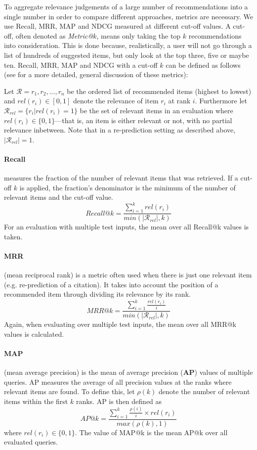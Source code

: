 To aggregate relevance judgements of a large number of recommendations into a single number in order to compare different approaches, metrics are necessary. We use Recall, MRR, MAP and NDCG measured at different cut-off values. A cut-off, often denoted as \emph{Metric@}$k$, means only taking the top $k$ recommendations into consideration. This is done because, realistically, a user will not go through a list of hundreds of suggested items, but only look at the top three, five or maybe ten. Recall, MRR, MAP and NDCG with a cut-off $k$ can be defined as follows (see \cite{Aggarwal2016} for a more detailed, general discussion of these metrics):

Let $\mathcal{R} = r_1,r_2, ..., r_n$ be the ordered list of recommended items (highest to lowest) and ${\mathit{rel}(r_i)\in[0, 1]}$ denote the relevance of item $r_i$ at rank $i$. Furthermore let ${\mathcal{R}_{rel}=\{r_i|\mathit{rel}(r_i)=1\}}$ be the set of relevant items in an evaluation where $\mathit{rel}(r_i)\in\{0,1\}$---that is, an item is either relevant or not, with no partial relevance inbetween. Note that in a re-prediction setting as described above, $|\mathcal{R}_{rel}|=1$.

\paragraph{Recall} measures the fraction of the number of relevant items that was retrieved. If a cut-off $k$ is applied, the fraction's denominator is the minimum of the number of relevant items and the cut-off value.\[ \mathit{Recall}@k = \frac{\sum\limits_{i=1}^{k} \mathit{rel}(r_i)}{\mathit{min}(|\mathcal{R}_{rel}|,k)} \] For an evaluation with multiple test inputs, the mean over all Recall@k values is taken.

\paragraph{MRR} (mean reciprocal rank) is a metric often used when there is just one relevant item (e.g. re-prediction of a citation). It takes into account the position of a recommended item through dividing its relevance by its rank.\[ \mathit{MRR}@k = \frac{\sum\limits_{i=1}^{k} \frac{\mathit{rel}(r_i)}{i}}{\mathit{min}(|\mathcal{R}_{rel}|,k)} \] Again, when evaluating over multiple test inputs, the mean over all MRR@k values is calculated.

\paragraph{MAP} (mean average precision) is the mean of average precision (\textbf{AP}) values of multiple queries. AP measures the average of all precision values at the ranks where relevant items are found. To define this, let $\rho(k)$ denote the number of relevant items within the first $k$ ranks. AP is then defined as \[ \mathit{AP}@k = \frac{\sum\limits_{i=1}^{k} \frac{\rho(i)}{i}\times\mathit{rel}(r_i)}{\mathit{max}(\rho(k), 1)} \] where $\mathit{rel}(r_i)\in\{0,1\}$. The value of MAP@k is the mean AP@k over all evaluated queries.

